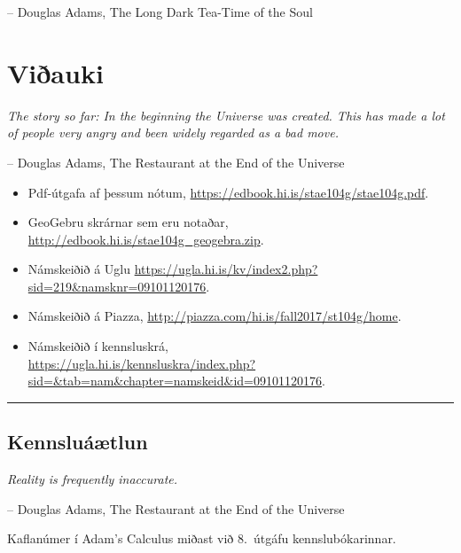 \documentclass[b5paper,10pt,icelandic]{sphinxmanual}
\begin{document}
-- Douglas Adams, The Long Dark Tea-Time of the Soul


\chapter{Viðauki}
\label{vidauki::doc}\label{vidauki:viauki}
\emph{The story so far:
In the beginning the Universe was created.
This has made a lot of people very angry and been widely regarded as a bad move.}

-- Douglas Adams, The Restaurant at the End of the Universe
\begin{itemize}

\item {} 
Pdf-útgafa af þessum nótum, \href{https://edbook.hi.is/stae104g/stae104g.pdf}{https://edbook.hi.is/stae104g/stae104g.pdf}.

\item {} 
GeoGebru skrárnar sem eru notaðar, \href{http://edbook.hi.is/stae104g\_geogebra.zip}{http://edbook.hi.is/stae104g\_geogebra.zip}.

\item {} 
Námskeiðið á Uglu \href{https://ugla.hi.is/kv/index2.php?sid=219\&namsknr=09101120176}{https://ugla.hi.is/kv/index2.php?sid=219\&namsknr=09101120176}.

\item {} 
Námskeiðið á Piazza, \href{http://piazza.com/hi.is/fall2017/st104g/home}{http://piazza.com/hi.is/fall2017/st104g/home}.

\item {} 
Námskeiðið í kennsluskrá,\\ \href{https://ugla.hi.is/kennsluskra/index.php?sid=\&tab=nam\&chapter=namskeid\&id=09101120176}{https://ugla.hi.is/kennsluskra/index.php?sid=\&tab=nam\&chapter=namskeid\&id=09101120176}.

\end{itemize}
\newpage

\bigskip\hrule{}\bigskip



\section{Kennsluáætlun}
\label{vidauki:kennsluaaetlun}
\emph{Reality is frequently inaccurate.}

-- Douglas Adams, The Restaurant at the End of the Universe

Kaflanúmer í Adam’s Calculus miðast við 8. útgáfu kennslubókarinnar.
\end{document}
